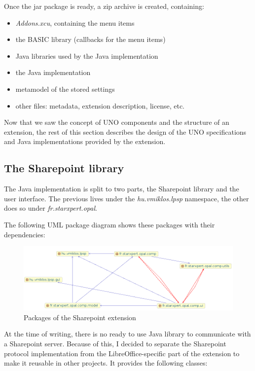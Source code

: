 Once the jar package is ready, a zip archive is created, containing:

\begin{itemize}
\item \emph{Addons.xcu}, containing the menu items
\item the BASIC library (callbacks for the menu items)
\item Java libraries used by the Java implementation
\item the Java implementation
\item metamodel of the stored settings
\item other files: metadata, extension description, license, etc.
\end{itemize}

Now that we saw the concept of UNO components and the structure of an
extension, the rest of this section describes the design of the UNO
specifications and Java implementations provided by the extension.

\subsection{The Sharepoint library}

The Java implementation is split to two parts, the Sharepoint library and the
user interface. The previous lives under the \emph{hu.vmiklos.lpsp} namespace,
the other does so under \emph{fr.starxpert.opal}.

The following UML package diagram shows these packages with their dependencies:

\begin{figure}[H]
\centering
\includegraphics[width=425px,keepaspectratio]{design-packages.png}
\caption{Packages of the Sharepoint extension}
\end{figure}

At the time of writing, there is no ready to use Java library to communicate
with a Sharepoint server. Because of this, I decided to separate the Sharepoint
protocol implementation from the LibreOffice-specific part of the extension to
make it reusable in other projects. It provides the following classes:

